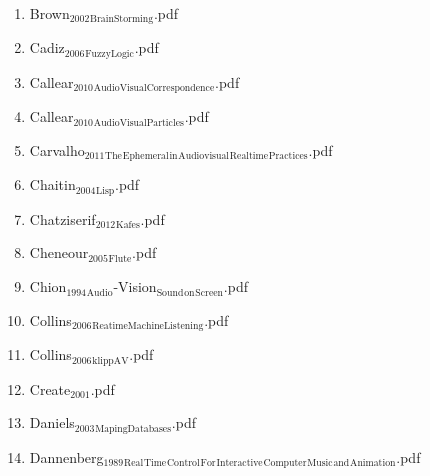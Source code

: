 \documentclass[11pt]{article}
\begin{document}
\begin{enumerate}
\begin{enumerate}
\begin{enumerate}
\begin{enumerate}
\begin{enumerate}
\item Brown$_{\text{2002}}$$_{\text{BrainStorming}}$.pdf
\label{sec-1-1-1-1-7-1-1-11}

\item Cadiz$_{\text{2006}}$$_{\text{FuzzyLogic}}$.pdf
\label{sec-1-1-1-1-7-1-1-12}

\item Callear$_{\text{2010}}$$_{\text{AudioVisualCorrespondence}}$.pdf
\label{sec-1-1-1-1-7-1-1-13}

\item Callear$_{\text{2010}}$$_{\text{AudioVisualParticles}}$.pdf
\label{sec-1-1-1-1-7-1-1-14}

\item Carvalho$_{\text{2011}}$$_{\text{The}}$$_{\text{Ephemeral}}$$_{\text{in}}$$_{\text{Audiovisual}}$$_{\text{Realtime}}$$_{\text{Practices}}$.pdf
\label{sec-1-1-1-1-7-1-1-15}

\item Chaitin$_{\text{2004}}$$_{\text{Lisp}}$.pdf
\label{sec-1-1-1-1-7-1-1-16}

\item Chatziserif$_{\text{2012}}$$_{\text{Kafes}}$.pdf
\label{sec-1-1-1-1-7-1-1-17}

\item Cheneour$_{\text{2005}}$$_{\text{Flute}}$.pdf
\label{sec-1-1-1-1-7-1-1-18}

\item Chion$_{\text{1994}}$$_{\text{Audio}}$-Vision$_{\text{Sound}}$$_{\text{on}}$$_{\text{Screen}}$.pdf
\label{sec-1-1-1-1-7-1-1-19}

\item Collins$_{\text{2006}}$$_{\text{ReatimeMachineListening}}$.pdf
\label{sec-1-1-1-1-7-1-1-20}

\item Collins$_{\text{2006}}$$_{\text{klippAV}}$.pdf
\label{sec-1-1-1-1-7-1-1-21}

\item Create$_{\text{2001}}$.pdf
\label{sec-1-1-1-1-7-1-1-22}

\item Daniels$_{\text{2003}}$$_{\text{MapingDatabases}}$.pdf
\label{sec-1-1-1-1-7-1-1-23}

\item Dannenberg$_{\text{1989}}$$_{\text{Real}}$$_{\text{Time}}$$_{\text{Control}}$$_{\text{For}}$$_{\text{Interactive}}$$_{\text{Computer}}$$_{\text{Music}}$$_{\text{and}}$$_{\text{Animation}}$.pdf
\label{sec-1-1-1-1-7-1-1-24}


\end{enumerate}
\end{enumerate}
\end{enumerate}
\end{enumerate}
\end{enumerate}
\end{document}
